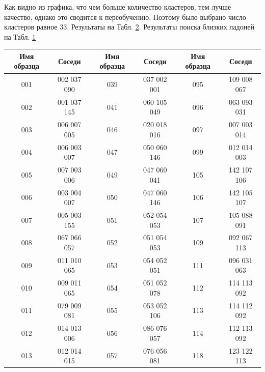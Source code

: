 \documentclass[12pt,fleqn]{article}
\begin{document}
Как видно из графика, что чем больше количество кластеров, тем лучше качество, однако это сводится к переобучению. Поэтому было выбрано число кластеров равное $33$. Результаты на Табл. \hyperref[tabular2]{2}. Результаты поиска близких ладоней на Табл. \hyperref[tabular1]{1}

\newpage
\begin{table}[h]
\begin{center}
\begin{tabular}{|c|c|c|c|c|c|}
\hline
Имя образца & Соседи & Имя образца & Соседи & Имя образца & Соседи \\ \hline
         001 &            002 037 090  &         039 &            037 002 001  &         095 &            109 008 067  \\ 
         002 &            001 037 145  &         041 &            060 105 049  &         096 &            063 093 031  \\
        003 &            006 007 005  &         046 &            020 018 016  &         097 &            007 003 014  \\
        004 &            006 003 007  &         047 &            050 060 146  &         099 &            012 014 003  \\
         005 &            007 003 006  &         049 &            047 060 041  &         105 &            142 107 106  \\
        006 &            003 004 007  &         050 &            047 060 146  &         106 &            142 105 107  \\
         007 &            005 003 155  &         051 &            052 054 053  &         107 &            105 088 091  \\
        008 &            067 066 057  &         052 &            051 054 053  &         109 &            092 067 113  \\
         009 &            011 010 065  &         053 &            054 052 051  &         111 &            096 031 063  \\
        010 &            009 011 065  &         054 &            051 052 078  &         112 &            114 113 092  \\
         011 &            079 009 081  &         055 &            053 052 106  &         113 &            114 112 092  \\
         012 &            014 013 006  &         056 &            086 076 057  &         114 &            112 113 092  \\
         013 &            012 014 015  &         057 &            076 056 081  &         118 &            123 122 113  \\

\end{tabular}
\end{center}
\end{table}
\end{document}

